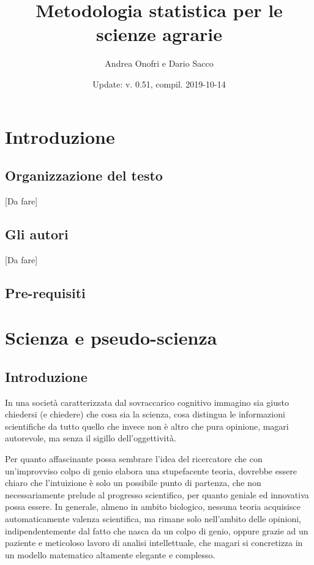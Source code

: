 \documentclass[a4paper,12pt,oneside]{book}
\author{Andrea Onofri e Dario Sacco}
\date{Update: v. 0.51, compil. 2019-10-14}
\title{Metodologia statistica per le scienze agrarie}
\subtitle{}
\theoremstyle{definition}
\theoremstyle{definition}
\theoremstyle{definition}
\theoremstyle{remark}
\begin{document}
\maketitle
\tableofcontents

\chapter*{Introduzione}\label{introduzione}

\section*{Organizzazione del testo}\label{organizzazione-del-testo}

{[}Da fare{]}

\section*{Gli autori}\label{gli-autori}

{[}Da fare{]}

\section*{Pre-requisiti}\label{pre-requisiti}

\chapter{Scienza e pseudo-scienza}\label{scienza-e-pseudo-scienza}

\section{Introduzione}\label{introduzione-1}

In una società caratterizzata dal sovraccarico cognitivo immagino sia
giusto chiedersi (e chiedere) che cosa sia la scienza, cosa distingua le
informazioni scientifiche da tutto quello che invece non è altro che
pura opinione, magari autorevole, ma senza il sigillo dell'oggettività.

Per quanto affascinante possa sembrare l'idea del ricercatore che con
un'improvviso colpo di genio elabora una stupefacente teoria, dovrebbe
essere chiaro che l'intuizione è solo un possibile punto di partenza,
che non necessariamente prelude al progresso scientifico, per quanto
geniale ed innovativa possa essere. In generale, almeno in ambito
biologico, nessuna teoria acquisisce automaticamente valenza
scientifica, ma rimane solo nell'ambito delle opinioni,
indipendentemente dal fatto che nasca da un colpo di genio, oppure
grazie ad un paziente e meticoloso lavoro di analisi intellettuale, che
magari si concretizza in un modello matematico altamente elegante e
complesso.
\end{document}
